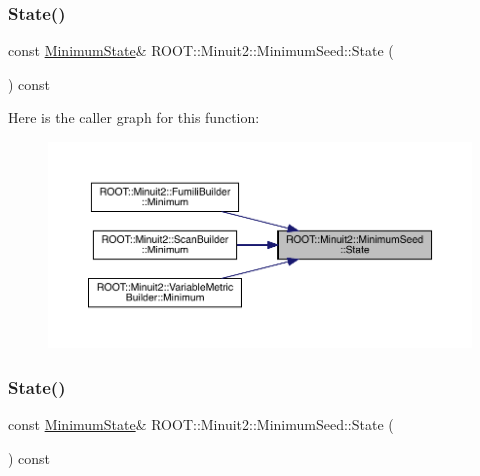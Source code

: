 \mbox{\label{classROOT_1_1Minuit2_1_1MinimumSeed_a732476aa579a27366511684213835a2e}} 
\subsubsection{\texorpdfstring{State()}{State()}\hspace{0.1cm}{\footnotesize\ttfamily [2/3]}}
{\footnotesize\ttfamily const \mbox{\hyperlink{classROOT_1_1Minuit2_1_1MinimumState}{Minimum\+State}}\& R\+O\+O\+T\+::\+Minuit2\+::\+Minimum\+Seed\+::\+State (\begin{DoxyParamCaption}{ }\end{DoxyParamCaption}) const\hspace{0.3cm}{\ttfamily [inline]}}

Here is the caller graph for this function\+:
\nopagebreak
\begin{figure}[H]
\begin{center}
\leavevmode
\includegraphics[width=350pt]{d1/d50/classROOT_1_1Minuit2_1_1MinimumSeed_a732476aa579a27366511684213835a2e_icgraph}
\end{center}
\end{figure}
\mbox{\label{classROOT_1_1Minuit2_1_1MinimumSeed_a732476aa579a27366511684213835a2e}} 
\subsubsection{\texorpdfstring{State()}{State()}\hspace{0.1cm}{\footnotesize\ttfamily [3/3]}}
{\footnotesize\ttfamily const \mbox{\hyperlink{classROOT_1_1Minuit2_1_1MinimumState}{Minimum\+State}}\& R\+O\+O\+T\+::\+Minuit2\+::\+Minimum\+Seed\+::\+State (\begin{DoxyParamCaption}{ }\end{DoxyParamCaption}) const\hspace{0.3cm}{\ttfamily [inline]}}

